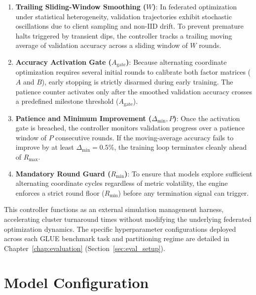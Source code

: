 \begin{enumerate}
    \item \textbf{Trailing Sliding-Window Smoothing ($W$)}: In federated optimization under statistical heterogeneity, validation trajectories exhibit stochastic oscillations due to client sampling and non-IID drift. To prevent premature halts triggered by transient dips, the controller tracks a trailing moving average of validation accuracy across a sliding window of $W$ rounds.
    \item \textbf{Accuracy Activation Gate ($A_{\text{gate}}$)}: Because alternating coordinate optimization requires several initial rounds to calibrate both factor matrices ($A$ and $B$), early stopping is strictly disarmed during early training. The patience counter activates only after the smoothed validation accuracy crosses a predefined milestone threshold ($A_{\text{gate}}$).
    \item \textbf{Patience and Minimum Improvement ($\Delta_{\min}, P$)}: Once the activation gate is breached, the controller monitors validation progress over a patience window of $P$ consecutive rounds. If the moving-average accuracy fails to improve by at least $\Delta_{\min} = 0.5\%$, the training loop terminates cleanly ahead of $R_{\max}$.
    \item \textbf{Mandatory Round Guard ($R_{\min}$)}: To ensure that models explore sufficient alternating coordinate cycles regardless of metric volatility, the engine enforces a strict round floor ($R_{\min}$) before any termination signal can trigger.
\end{enumerate}

This controller functions as an external simulation management harness, accelerating cluster turnaround times without modifying the underlying federated optimization dynamics. The specific hyperparameter configurations deployed across each GLUE benchmark task and partitioning regime are detailed in Chapter~\ref{chap:evaluation} (Section~\ref{sec:eval_setup}).

\section{Model Configuration}
\label{sec:impl_model_config}


